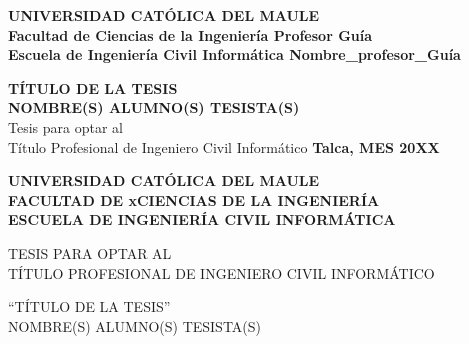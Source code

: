 \documentclass[letterpaper, 12pt]{article}
\begin{document}
\renewcommand{\listtablename}{Índice de tablas}
\renewcommand{\tablename}{Tabla}

\thispagestyle{empty}

\textbf{
\small{
\hspace{-0.2cm}UNIVERSIDAD CATÓLICA DEL MAULE  \\
Facultad de Ciencias de la Ingeniería  \hfill  Profesor Guía\hspace{-0.1cm}\\
Escuela de Ingeniería Civil Informática \hfill  Nombre\_profesor\_Guía\\
}
}
\vspace{5cm}
\begin{center}
		{\bf {\normalsize TÍTULO DE LA TESIS}}\\
\vspace{1cm}
        {\bf {\normalsize NOMBRE(S) ALUMNO(S) TESISTA(S)}}\\
\vspace{1cm}
        {\normalsize Tesis  para optar al}\\
        {\normalsize Título Profesional de Ingeniero Civil Informático}
\vfill
\textbf{Talca, MES 20XX}
\end{center}

\newpage

\thispagestyle{empty}

\begin{center}
\textbf{
    UNIVERSIDAD CATÓLICA DEL MAULE\\
    FACULTAD DE xCIENCIAS DE LA INGENIERÍA\\
    ESCUELA DE INGENIERÍA CIVIL INFORMÁTICA\\
}
\vspace{1.5cm}

TESIS PARA OPTAR AL\\
TÍTULO PROFESIONAL DE INGENIERO CIVIL INFORMÁTICO\\

\vspace{1.2cm}

``TÍTULO DE LA TESIS''\\
NOMBRE(S) ALUMNO(S) TESISTA(S)\\

\end{center}

\vspace{0.5cm}
\end{document}
